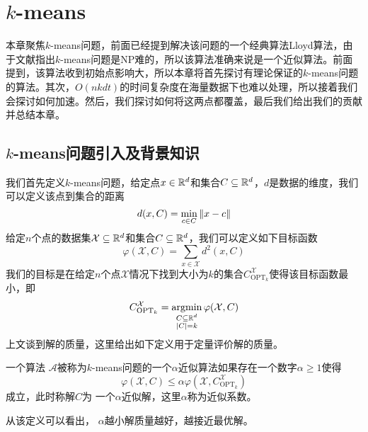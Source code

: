 \chapter{\texorpdfstring{$k$}{k}-means}
本章聚焦$k$-means问题，前面已经提到解决该问题的一个经典算法Lloyd算法，由于文献\cite{garey1982complexity,kleinberg1998microeconomic,mahajan2009planar}指出$k$-means问题是NP难的，所以该算法准确来说是一个近似算法。前面提到，该算法收到初始点影响大，所以本章将首先探讨有理论保证的$k$-means问题的算法。其次，$O(nkdt)$的时间复杂度在海量数据下也难以处理，所以接着我们会探讨如何加速。然后，我们探讨如何将这两点都覆盖，最后我们给出我们的贡献并总结本章。

\section{\texorpdfstring{$k$}{k}-means问题引入及背景知识}
我们首先定义$k$-means问题，给定点$x \in \mathbb{R}^d$和集合$C \subseteq \mathbb{R}^d$，$d$是数据的维度，我们可以定义该点到集合的距离
\begin{equation}
d(x,C) = \min\limits_{c \in C}\left\lVert x - c\right\rVert
\end{equation}
给定$n$个点的数据集$\mathcal{X} \subseteq \mathbb{R}^d$和集合$C \subseteq \mathbb{R}^d$，我们可以定义如下目标函数
\begin{equation}
\varphi(\mathcal{X},C) = \sum_{x \in \mathcal{X}}d^2 (x,C)
\end{equation}
我们的目标是在给定$n$个点$\mathcal{X}$情况下找到大小为$k$的集合$C_{\text{OPT}_k}^\mathcal{X}$使得该目标函数最小，即
\begin{equation}
C_{\text{OPT}_k}^\mathcal{X} = \operatorname*{argmin}\limits_{ \substack{C \subseteq \mathbb{R}^d \\ |C| = k} }\varphi(\mathcal{X},C)
\end{equation}
上文谈到解的质量，这里给出如下定义用于定量评价解的质量。
\begin{definition}[$k$-means问题解的质量]
    \label{def: k-means_quality}
    一个算法 $\mathcal{A}$被称为$k$-means问题的一个$\alpha$近似算法如果存在一个数字$\alpha \geq 1$使得
    \begin{equation}
        \varphi(\mathcal{X},C) \leq \alpha \varphi(\mathcal{X},C_{\text{OPT}_k}^{\mathcal{X}})
    \end{equation}
    成立，此时称解$C$为
一个$\alpha$近似解，这里$\alpha$称为近似系数。
\end{definition}
从该定义可以看出， $\alpha$越小解质量越好，越接近最优解。